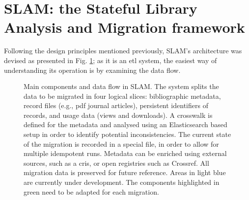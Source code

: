 \newpage

\section{SLAM: the Stateful  Library  Analysis  and  Migration framework}
\label{sec:slam}

Following the design principles mentioned previously, SLAM's architecture was devised as presented in Fig. \ref{fig:workflow}; as it is an \gls{etl} system, the easiest way of understanding its operation is by examining the data flow.

\begin{figure}
  \centering
  \caption{Main components and data flow in SLAM. The system splits the data to be migrated in four logical slices: bibliographic metadata, record files (e.g., \gls{pdf} journal articles), persistent identifiers of records, and usage data (views and downloads). A crosswalk is defined for the metadata and analysed using an Elasticsearch based setup in order to identify potential inconsistencies. The current state of the migration is recorded in a special file, in order to allow for multiple idempotent runs. Metadata can be enriched using external sources, such as a \gls{cris}, or open registries such as Crossref. All migration data is preserved for future reference. Areas in light blue are currently under development. The components highlighted in green need to be adapted for each migration.}
  \label{fig:workflow}
\end{figure}
\afterpage{\clearpage}

